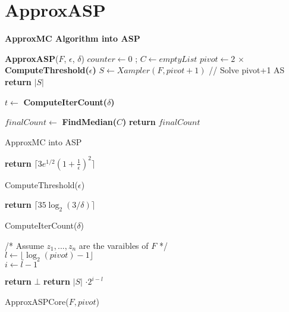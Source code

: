 \section{ApproxASP}

\textbf{ApproxMC Algorithm into ASP}

\begin{algorithm}[h]
\textbf{ApproxASP}($F$, $\epsilon$, $\delta$) \;
\SetAlgoLined
{}
 $counter \gets 0$ ; $C \gets emptyList$\;
 $pivot \gets  2 \, \times $ \textbf{ComputeThreshold($\epsilon$)} \;
 $S \gets Xampler(F, pivot + 1)$ // {Solve pivot+1 AS}  \;
 { %
 \textbf{return} $|S|$  
 } %
 { %
 $t \gets $ \textbf{ComputeIterCount($\delta$)} 
 
 } %
 $finalCount \gets $ \textbf{FindMedian($C$)} \;
 \textbf{return} $finalCount$
 
 \caption{ApproxMC into ASP}
\end{algorithm}


\begin{algorithm}
\textbf{return} $\lceil 3 e^{1/2} (1 + \frac{1}{\epsilon})^2 \rceil$
\caption{ComputeThreshold($\epsilon$)}
\end{algorithm}

\begin{algorithm}
\textbf{return} $\lceil 35 \log_2 (3/\delta) \rceil$
\caption{ComputeIterCount($\delta$)}
\end{algorithm}

\begin{algorithm}
/* Assume $z_1 , ..., z_n $ are the varaibles of $F$ */ \\
$ l \gets \lfloor \log_2 (pivot) - 1 \rfloor$ \\
$ i \gets l - 1$ \\

 
 {\textbf{return} $\bot$}
 {\textbf{return} $|S|$ $\cdot 2^{i-l}$}
 
 

\caption{ApproxASPCore($F, pivot$)}
\end{algorithm}
